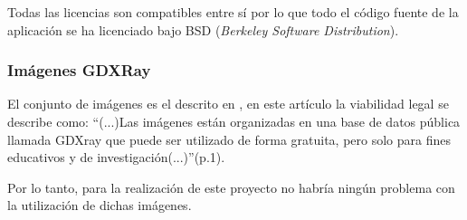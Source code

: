 Todas las licencias son compatibles entre sí por lo que todo el código fuente de la aplicación se ha licenciado bajo BSD (\textit{Berkeley Software Distribution}).

\subsubsection{Imágenes GDXRay}

El conjunto de imágenes es el descrito en \cite{GDXray:imagenes}, en este artículo la viabilidad legal se describe como: ``(...)Las imágenes están organizadas en una base de datos pública llamada GDXray que puede ser utilizado de forma gratuita, pero solo para fines educativos y de investigación(...)''(p.1).

Por lo tanto, para la realización de este proyecto no habría ningún problema con la utilización de dichas imágenes.